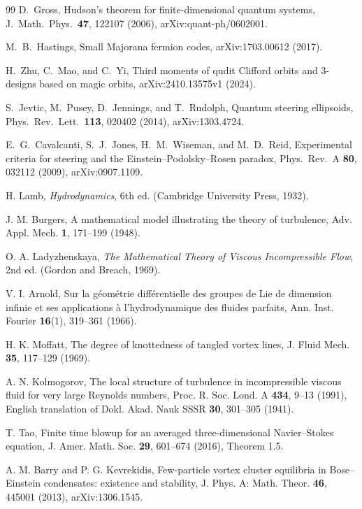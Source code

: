\documentclass[aps,pra,onecolumn,superscriptaddress,nofootinbib,10pt]{revtex4-2}
\theoremstyle{definition}
\theoremstyle{remark}
\begin{document}
\begin{thebibliography}{99}
 D.~Gross, Hudson's theorem for finite-dimensional quantum systems, J.\ Math.\ Phys.\ \textbf{47}, 122107 (2006), arXiv:quant-ph/0602001.

 M.~B.~Hastings, Small Majorana fermion codes, arXiv:1703.00612 (2017).

 H.~Zhu, C.~Mao, and C.~Yi, Third moments of qudit Clifford orbits and 3-designs based on magic orbits, arXiv:2410.13575v1 (2024).

 S.~Jevtic, M.~Pusey, D.~Jennings, and T.~Rudolph, Quantum steering ellipsoids, Phys.\ Rev.\ Lett.\ \textbf{113}, 020402 (2014), arXiv:1303.4724.

 E.~G.~Cavalcanti, S.~J.~Jones, H.~M.~Wiseman, and M.~D.~Reid, Experimental criteria for steering and the Einstein--Podolsky--Rosen paradox, Phys.\ Rev.\ A \textbf{80}, 032112 (2009), arXiv:0907.1109.

 H. Lamb, \emph{Hydrodynamics}, 6th ed. (Cambridge University Press, 1932).

 J. M. Burgers, A mathematical model illustrating the theory of turbulence, Adv. Appl. Mech. \textbf{1}, 171--199 (1948).

 O. A. Ladyzhenskaya, \emph{The Mathematical Theory of Viscous Incompressible Flow}, 2nd ed. (Gordon and Breach, 1969).

 V. I. Arnold, Sur la g\'eom\'etrie diff\'erentielle des groupes de Lie de dimension infinie et ses applications \`a l'hydrodynamique des fluides parfaits, Ann. Inst. Fourier \textbf{16}(1), 319--361 (1966).

 H. K. Moffatt, The degree of knottedness of tangled vortex lines, J. Fluid Mech. \textbf{35}, 117--129 (1969).

 A. N. Kolmogorov, The local structure of turbulence in incompressible viscous fluid for very large Reynolds numbers, Proc. R. Soc. Lond. A \textbf{434}, 9--13 (1991), English translation of Dokl. Akad. Nauk SSSR \textbf{30}, 301--305 (1941).

 T. Tao, Finite time blowup for an averaged three-dimensional Navier--Stokes equation, J. Amer. Math. Soc. \textbf{29}, 601--674 (2016), Theorem 1.5.

 A. M. Barry and P. G. Kevrekidis, Few-particle vortex cluster equilibria in Bose--Einstein condensates: existence and stability, J. Phys. A: Math. Theor. \textbf{46}, 445001 (2013), arXiv:1306.1545.


\end{thebibliography}
\end{document}
